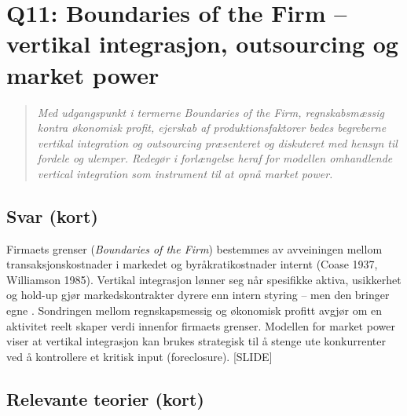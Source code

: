 \section{Q11: Boundaries of the Firm -- vertikal integrasjon, outsourcing og market power}\label{q:11}

\begin{quote}
\emph{Med udgangspunkt i termerne Boundaries of the Firm, regnskabsmæssig kontra økonomisk profit, ejerskab af produktionsfaktorer bedes begreberne vertikal integration og outsourcing præsenteret og diskuteret med hensyn til fordele og ulemper. Redegør i forlængelse heraf for modellen omhandlende vertical integration som instrument til at opnå market power.}
\end{quote}

\subsection*{Svar (kort)}
Firmaets grenser (\emph{Boundaries of the Firm}) bestemmes av avveiningen mellom transaksjonskostnader i markedet og byråkratikostnader internt (Coase 1937, Williamson 1985). Vertikal integrasjon lønner seg når spesifikke aktiva, usikkerhet og hold-up gjør markedskontrakter dyrere enn intern styring -- men den bringer egne . Sondringen mellom regnskapsmessig og økonomisk profitt avgjør om en aktivitet reelt skaper verdi innenfor firmaets grenser. Modellen for market power viser at vertikal integrasjon kan brukes strategisk til å stenge ute konkurrenter ved å kontrollere et kritisk input (foreclosure). [SLIDE]

\subsection*{Relevante teorier (kort)}

